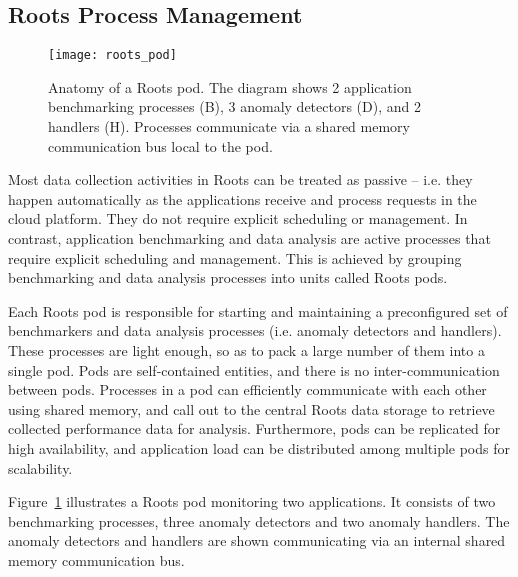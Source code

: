 
\subsection{Roots Process Management}
\label{sec:process_mgt}

\begin{figure}
\centering
\texttt{[image: roots\_pod]}
\caption{Anatomy of a Roots pod. The diagram shows 2 application benchmarking processes (B), 
3 anomaly detectors (D), and 2 handlers (H). Processes communicate via a shared
memory communication bus local to the pod.}
\label{fig:roots_pod}
\end{figure}
Most data collection activities in Roots can be treated as passive -- i.e. they
happen automatically as the applications receive and process requests in the cloud
platform. They do not require explicit scheduling or management. In contrast,
application benchmarking and data analysis are active processes that require
explicit scheduling and management.  This is achieved by grouping benchmarking
and data analysis processes into units called Roots pods. 

Each Roots pod is responsible for starting and maintaining a preconfigured set of
benchmarkers and data analysis processes (i.e. anomaly detectors and handlers). 
These processes are light enough, so as to pack a large number of them
into a single pod. Pods are self-contained entities, and there is no inter-communication
between pods. Processes in a pod can efficiently communicate with each other 
using shared memory, and call out to the central Roots data storage to retrieve 
collected performance data for analysis. 
Furthermore, pods
can be replicated for high availability, and application load can be distributed
among multiple pods for scalability.

Figure~\ref{fig:roots_pod} illustrates a Roots pod monitoring two applications.
It consists of two benchmarking processes, three anomaly detectors and 
two anomaly handlers. The anomaly detectors and handlers are shown communicating
via an internal shared memory communication bus. 

